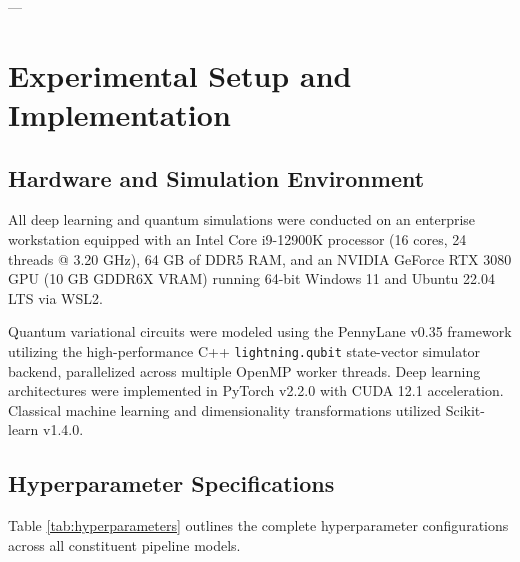 \documentclass[preprint,12pt]{elsarticle}
\begin{document}
---

\section{Experimental Setup and Implementation}
\label{sec:experiments}

\subsection{Hardware and Simulation Environment}
All deep learning and quantum simulations were conducted on an enterprise workstation equipped with an Intel Core i9-12900K processor (16 cores, 24 threads @ 3.20 GHz), 64 GB of DDR5 RAM, and an NVIDIA GeForce RTX 3080 GPU (10 GB GDDR6X VRAM) running 64-bit Windows 11 and Ubuntu 22.04 LTS via WSL2. 

Quantum variational circuits were modeled using the PennyLane v0.35 framework utilizing the high-performance C++ \texttt{lightning.qubit} state-vector simulator backend, parallelized across multiple OpenMP worker threads. Deep learning architectures were implemented in PyTorch v2.2.0 with CUDA 12.1 acceleration. Classical machine learning and dimensionality transformations utilized Scikit-learn v1.4.0.

\subsection{Hyperparameter Specifications}
Table \ref{tab:hyperparameters} outlines the complete hyperparameter configurations across all constituent pipeline models.
\end{document}
